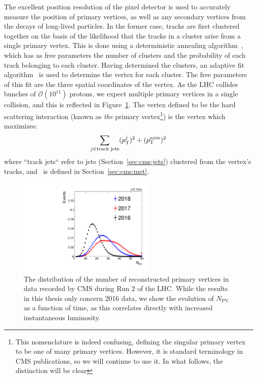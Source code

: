 The excellent position resolution of the pixel detector is used to accurately measure the position of primary vertices, as well as any secondary vertices from the decays of long-lived particles.
In the former case, tracks are first clustered together on the basis of the likelihood that the tracks in a cluster arise from a single primary vertex.
This is done using a deterministic annealing algorithm~\cite{da}, which has as free parameters the number of clusters and the probability of each track belonging to each cluster.
Having determined the clusters, an adaptive fit algorithm~\cite{adaptivefit} is used to determine the vertex for each cluster.
The free parameters of this fit are the three spatial coordinates of the vertex.
As the LHC collides bunches of $\mathcal{O}(10^{11})$ protons, we expect multiple primary vertices in a single collision, and this is reflected in Figure~\ref{fig:cms:npv}.
The vertex defined to be the hard scattering interaction (known as \emph{the} primary vertex\footnote{This nomenclature is indeed confusing, defining the singular primary vertex to be one of many primary vertices. However, it is standard terminology in CMS publications, so we will continue to use it. In what follows, the distinction will be clear}) is the vertex which maximizes:
\begin{equation}
	\sum_{j\in\text{track jets}} (p_\mathrm{T}^j)^2 + (p_\mathrm{T}^\mathrm{miss})^2
\end{equation}
where ``track jets`` refer to jets (Section~\ref{sec:cms:jets}) clustered from the vertex's tracks, and \ptmiss~is defined in Section~\ref{sec:cms:met}.

\begin{figure}[]
    \begin{center} 
        \includegraphics[width=0.6\textwidth]{figures/cms/comparison_npv.pdf}
        \caption{The distribution of the number of reconstructed primary vertices in data recorded by CMS during Run 2 of the LHC.
				 While the results in this thesis only concern 2016 data, we show the evolution of $N_\mathrm{PV}$ as a function of time, as this correlates directly with increased instantaneous luminosity.}
        \label{fig:cms:npv}
    \end{center}
\end{figure}


